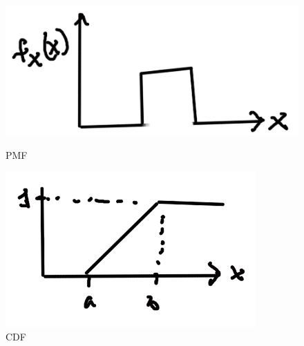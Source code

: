 \documentclass{article}
\begin{document}
\begin{figure}[ht]
\centering
\begin{minipage}{.45\linewidth}
  \includegraphics[width=\linewidth]{images/L08/continuous_unif_pdf.jpeg}
  \caption{PMF}
  \label{continuous_unif_pdf}
\end{minipage}
\hspace{.05\linewidth}
\begin{minipage}{.45\linewidth}
  \includegraphics[width=\linewidth]{images/L08/continuous_cdf.jpeg}
  \caption{CDF}
  \label{continuous_cdf}
\end{minipage}
\end{figure}

\edef\mylst{"1/6","3/6","2/6",""}
\end{document}
